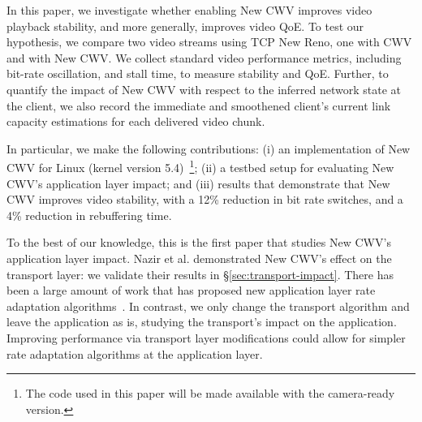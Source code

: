 \documentclass[10pt,sigconf]{acmart}
\begin{document}






In this paper, we investigate whether enabling New CWV improves video playback stability, and more generally, improves video QoE. To test our hypothesis, we compare two video streams using TCP New Reno, one with CWV and with New CWV. We collect standard video performance metrics, including bit-rate oscillation, and stall time, to measure stability and QoE. Further, to quantify the impact of New CWV with respect to the inferred network state at the client, we also record the immediate and smoothened client's current link capacity estimations for each delivered video chunk.

In particular, we make the following contributions: (i) an implementation of New CWV for Linux (kernel version 5.4)~\footnote{The code used in this paper will be made available with the camera-ready version.}; (ii) a testbed setup for evaluating New CWV's application layer impact; and (iii) results that demonstrate that New CWV improves video stability, with a 12\% reduction in bit rate switches, and a 4\% reduction in rebuffering time.


To the best of our knowledge, this is the first paper that studies New CWV's application layer impact. Nazir et al. \cite{Nazir-2014-performance-evaluation-congestion-window-validation-dash-newcwv} demonstrated New CWV's effect on the transport layer: we validate their results in \S\ref{sec:transport-impact}. There has been a large amount of work that has proposed new application layer rate adaptation algorithms~\cite{Mok-2012-qdash,Huang-2015-A-buffer-based-approach-to-rate-adaptation-bba, Yin-2015-a-control-theoritic-approach}. In contrast, we only change the transport algorithm and leave the application as is, studying the transport's impact on the application. Improving performance via transport layer modifications could allow for simpler rate adaptation algorithms at the application layer.
\end{document}
